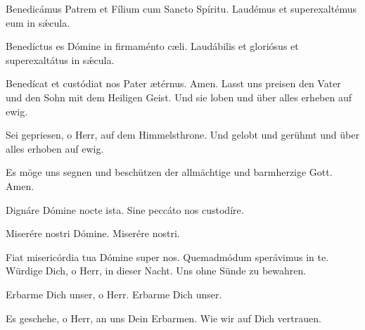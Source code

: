 \documentclass[fontsize=10pt,paper=A5,twoside,BCOR=1mm,DIV=21,headinclude]{scrarticle}
\begin{document}
\begin{paracol}{2} \pcb
\V Benedicámus Patrem et Fílium cum Sancto Spíritu.
\R Laudémus et superexaltémus eum in s\'æcula.

\V Benedíctus es Dómine in firmaménto cæli.
\R Laudábilis et gloriósus et superexaltátus in s\'æcula.

\V Benedícat et custódiat nos Pater ætérnus.
\R Amen.
	\switchcolumn
	\V Lasst uns preisen den Vater und den Sohn mit dem Heiligen Geist.
	\R Und sie loben und über alles erheben auf ewig.

	\V Sei gepriesen, o Herr, auf dem Himmelsthrone.
	\R Und gelobt und gerühmt und über alles erhoben auf ewig.

	\V Es möge uns segnen und beschützen der allmächtige und barmherzige Gott.
	\R Amen.

\switchcolumn*
\V Dignáre Dómine nocte ista.
\R Sine peccáto nos custodíre.

\V Miserére nostri Dómine.
\R Miserére nostri.

\V Fiat misericórdia tua Dómine super nos.
\R Quemadmódum sperávimus in te.
	\switchcolumn
	\V Würdige Dich, o Herr, in dieser Nacht.
	\R Uns ohne Sünde zu bewahren.

	\V Erbarme Dich unser, o Herr.
	\R Erbarme Dich unser.

	\V Es geschehe, o Herr, an uns Dein Erbarmen.
	\R Wie wir auf Dich vertrauen.
\end{paracol}


\hfill\red{\noindent\rule{0.7 \textwidth}{.1pt}}\hfill\null


\vspace{0.3em}
\end{document}
